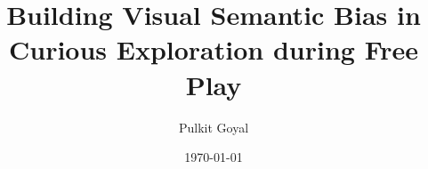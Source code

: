 \documentclass[11pt,a4paper]{report}
\title{Building Visual Semantic Bias in Curious Exploration during Free Play}
\author{Pulkit Goyal}
\date{\today}
\begin{document}



\tableofcontents

\pagestyle{fancy}





\pagestyle{plain}


\begin{appendices}    

\end{appendices}
\end{document}
